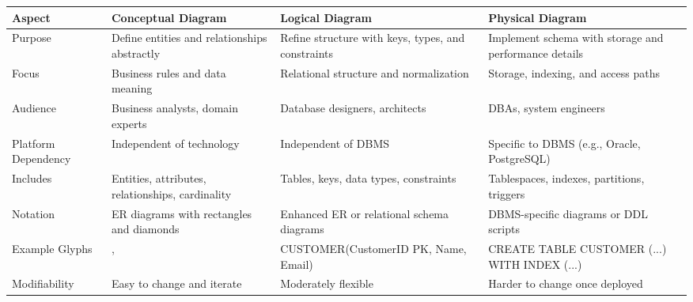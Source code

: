 \begin{NxLightListBox}[title={Conceptual, Logical, and Physical Diagrams}]
\end{NxLightListBox}

\begin{NxLightBox}[title={Schema Design Comparison}]
	\begin{tabularx}{\linewidth}{|l|X|X|X|}
		\hline
		\textbf{Aspect} & \textbf{Conceptual Diagram} & \textbf{Logical Diagram} & \textbf{Physical Diagram} \\
		\hline
		Purpose & Define entities and relationships abstractly & Refine structure with keys, types, and constraints & Implement schema with storage and performance details \\
		\hline
		Focus & Business rules and data meaning & Relational structure and normalization & Storage, indexing, and access paths \\
		\hline
		Audience & Business analysts, domain experts & Database designers, architects & DBAs, system engineers \\
		\hline
		Platform Dependency & Independent of technology & Independent of DBMS & Specific to DBMS (e.g., Oracle, PostgreSQL) \\
		\hline
		Includes & Entities, attributes, relationships, cardinality & Tables, keys, data types, constraints & Tablespaces, indexes, partitions, triggers \\
		\hline
		Notation & ER diagrams with rectangles and diamonds & Enhanced ER or relational schema diagrams & DBMS-specific diagrams or DDL scripts \\
		\hline
		Example Glyphs & \entity{Customer}, \relationship{Order}{Customer} & CUSTOMER(CustomerID PK, Name, Email) & CREATE TABLE CUSTOMER (...) WITH INDEX (...) \\
		\hline
		Modifiability & Easy to change and iterate & Moderately flexible & Harder to change once deployed \\
		\hline
	\end{tabularx}
\end{NxLightBox}


